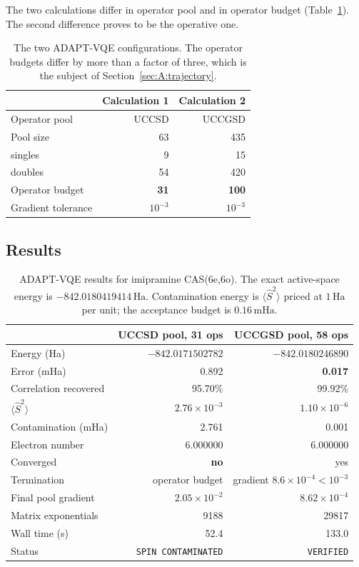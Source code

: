 \documentclass[11pt,a4paper]{article}
\newcommand{\mHa}{\ensuremath{\,\mathrm{mHa}}}
\newcommand{\Ha}{\ensuremath{\,\mathrm{Ha}}}
\newcommand{\Ssq}{\ensuremath{\langle \hat{S}^2 \rangle}}
\newcommand{\code}[1]{\texttt{\small #1}}
\begin{document}
The two calculations differ in operator pool and in operator budget
(Table~\ref{tab:A:config}). The second difference proves to be the operative
one.

\begin{table}[htbp]
\centering
\small
\caption{The two ADAPT-VQE configurations. The operator budgets differ by more
than a factor of three, which is the subject of
Section~\ref{sec:A:trajectory}.}
\label{tab:A:config}
\begin{tabular}{@{}lrr@{}}
\toprule
& \textbf{Calculation 1} & \textbf{Calculation 2} \\
\midrule
Operator pool & UCCSD & UCCGSD \\
Pool size & 63 & 435 \\
\quad singles & 9 & 15 \\
\quad doubles & 54 & 420 \\
Operator budget & \textbf{31} & \textbf{100} \\
Gradient tolerance & $10^{-3}$ & $10^{-3}$ \\
\bottomrule
\end{tabular}
\end{table}

\subsection{Results}

\begin{table}[htbp]
\centering
\small
\caption{ADAPT-VQE results for imipramine CAS(6e,6o). The exact active-space
energy is $-842.0180419414\Ha$. Contamination energy is $\Ssq$ priced at $1\Ha$
per unit; the acceptance budget is $0.16\mHa$.}
\label{tab:A:results}
\begin{tabular}{@{}lrr@{}}
\toprule
& \textbf{UCCSD pool, 31 ops} & \textbf{UCCGSD pool, 58 ops} \\
\midrule
Energy (Ha)                  & $-842.0171502782$ & $-842.0180246890$ \\
Error (mHa)                  & 0.892 & \textbf{0.017} \\
Correlation recovered        & 95.70\% & 99.92\% \\
$\Ssq$                       & $2.76\times10^{-3}$ & $1.10\times10^{-6}$ \\
Contamination (mHa)          & 2.761 & 0.001 \\
Electron number              & 6.000000 & 6.000000 \\
Converged                    & \textbf{no} & yes \\
Termination                  & operator budget & gradient $8.6\times10^{-4} < 10^{-3}$ \\
Final pool gradient          & $2.05\times10^{-2}$ & $8.62\times10^{-4}$ \\
Matrix exponentials          & 9188 & 29817 \\
Wall time (s)                & 52.4 & 133.0 \\
\midrule
Status                       & \code{SPIN CONTAMINATED} & \code{VERIFIED} \\
\bottomrule
\end{tabular}
\end{table}
\end{document}
